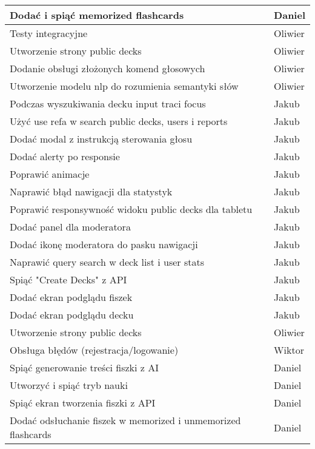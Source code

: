 \begin{longtable}{|p{}|p{}|}
    \hline
    [MOBILE] Dodać i spiąć memorized flashcards & Daniel \\
    \hline
    [BACKEND] Testy integracyjne & Oliwier \\
    \hline
    [WEB] Utworzenie strony public decks & Oliwier \\
    \hline
    [WEB] Dodanie obsługi złożonych komend głosowych & Oliwier \\
    \hline
    [BACKEND] Utworzenie modelu nlp do rozumienia semantyki słów & Oliwier \\
    \hline
    [MOBILE] Podczas wyszukiwania decku input traci focus & Jakub \\
    \hline
    [MOBILE] Użyć use refa w search public decks, users i reports & Jakub \\
    \hline
    [MOBILE] Dodać modal z instrukcją sterowania głosu & Jakub \\
    \hline
    [MOBILE] Dodać alerty po responsie & Jakub \\
    \hline
    [MOBILE] Poprawić animacje & Jakub \\
    \hline
    [MOBILE] Naprawić błąd nawigacji dla statystyk & Jakub \\
    \hline
    [MOBILE] Poprawić responsywność widoku public decks dla tabletu & Jakub \\
    \hline
    [MOBILE] Dodać panel dla moderatora & Jakub \\
    \hline
    [MOBILE] Dodać ikonę moderatora do pasku nawigacji & Jakub \\
    \hline
    [MOBILE] Naprawić query search w deck list i user stats & Jakub \\
    \hline
    [MOBILE] Spiąć "Create Decks" z API & Jakub \\
    \hline
    [MOBILE] Dodać ekran podglądu fiszek & Jakub \\
    \hline
    [MOBILE] Dodać ekran podglądu decku & Jakub \\
    \hline
    [WEB] Utworzenie strony public decks & Oliwier \\
    \hline
    [WEB] Obsługa błędów (rejestracja/logowanie) & Wiktor \\
    \hline
    [MOBILE] Spiąć generowanie treści fiszki z AI & Daniel \\
    \hline
    [MOBILE] Utworzyć i spiąć tryb nauki & Daniel \\
    \hline
    [MOBILE] Spiąć ekran tworzenia fiszki z API & Daniel \\
    \hline
    [MOBILE] Dodać odsłuchanie fiszek w memorized i unmemorized flashcards & Daniel \\

\end{longtable}
